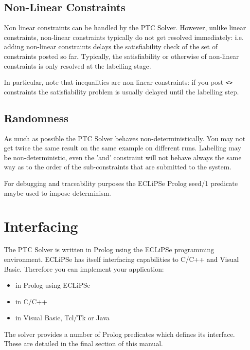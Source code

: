 \documentclass{article}
\begin{document}
\subsection{Non-Linear Constraints}
Non linear constraints can be handled by the PTC Solver. However, unlike linear constraints, non-linear constraints typically do not get resolved immediately:
 i.e. adding non-linear constraints delays the satisfiability check of the set of constraints posted so far. Typically, the satisfiability or otherwise of non-linear constraints is only resolved at the labelling stage.

In particular, note that inequalities are non-linear constraints: if you post \texttt{<>} constraints the satisfiability problem is usually delayed until the labelling step.

\subsection{Randomness}

As much as possible the PTC Solver behaves non-deterministically. You may not get twice the same result on the same example on different runs. Labelling may be non-deterministic, even the 'and' constraint will not
behave always the same way as to the order of the sub-constraints that are submitted to the system.

For debugging and traceability purposes the ECLiPSe Prolog seed/1 predicate maybe used to impose determinism.

\section{Interfacing}

The PTC Solver is written in Prolog using the ECLiPSe programming environment.
ECLiPSe has itself interfacing capabilities to C/C++ and Visual Basic.
Therefore you can implement your application:

\begin{itemize}
\item in Prolog using ECLiPSe
\item in C/C++
\item in Visual Basic, Tcl/Tk or Java
\end{itemize}

The solver provides a number of Prolog predicates which
defines its interface. These are detailed in the final
section of this manual.
\end{document}
